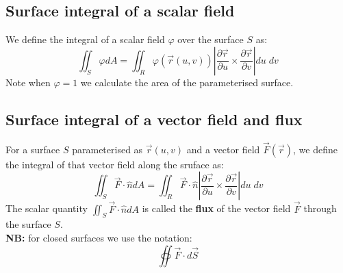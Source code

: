 \documentclass[11pt]{article}
\begin{document}
            \subsection{Surface integral of a scalar field}\label{subsec:surface-integral-of-a-scalar-field}
                We define the integral of a scalar field $\varphi$ over the surface $S$ as:
                \begin{equation}
                    \label{eq:equation7}
                    \iint_S \varphi dA = \iint_R \varphi(\vec{r}(u, v)) \left| \frac{\partial \vec{r}}{\partial u} \times \frac{\partial \vec{r}}{\partial v} \right| du \; dv
                \end{equation}
                Note when $\varphi = 1$ we calculate the area of the parameterised surface.
            \subsection{Surface integral of a vector field and flux}\label{subsec:surface-integral-of-a-vector-field-and-flux}
                For a surface $S$ parameterised as $\vec{r}(u, v)$ and a vector field $\vec{F}(\vec{r})$,
                we define the integral of that vector field along the sruface as:
                \begin{equation}
                    \label{eq:equation8}
                    \iint_S \vec{F} \cdot \hat{n} dA = \iint_R \vec{F} \cdot \hat{n} \left| \frac{\partial \vec{r}}{\partial u} \times \frac{\partial \vec{r}}{\partial v} \right| du \; dv
                \end{equation}
                The scalar quantity $ \iint_S \vec{F} \cdot \hat{n} dA$ is called the \textbf{flux} of the vector field
                $\vec{F}$ through the surface $S$.
                \\
                \textbf{NB:} for closed surfaces we use the notation:
                \begin{equation}
                    \label{eq:equation9}
                    \oiint \vec{F} \cdot d\vec{S}
                \end{equation}
\end{document}
